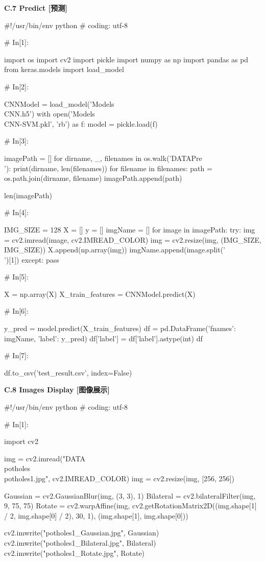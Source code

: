 \documentclass{MathorCupmodeling}
\begin{document}
\textbf{C.7 Predict [预测]}
\begin{python}
#!/usr/bin/env python
# coding: utf-8

# In[1]:


import os
import cv2
import pickle
import numpy as np
import pandas as pd
from keras.models import load_model

# In[2]:


CNNModel = load_model('Models\\CNN.h5')
with open('Models\\CNN-SVM.pkl', 'rb') as f:
    model = pickle.load(f)

# In[3]:


imagePath = []
for dirname, _, filenames in os.walk('DATAPre\\'):
    print(dirname, len(filenames))
    for filename in filenames:
        path = os.path.join(dirname, filename)
        imagePath.append(path)

len(imagePath)

# In[4]:


IMG_SIZE = 128
X = []
y = []
imgName = []
for image in imagePath:
    try:
        img = cv2.imread(image, cv2.IMREAD_COLOR)
        img = cv2.resize(img, (IMG_SIZE, IMG_SIZE))
        X.append(np.array(img))
        imgName.append(image.split('\\')[1])
    except:
        pass

# In[5]:


X = np.array(X)
X_train_features = CNNModel.predict(X)

# In[6]:


y_pred = model.predict(X_train_features)
df = pd.DataFrame({'fnames': imgName, 'label': y_pred})
df['label'] = df['label'].astype(int)
df

# In[7]:


df.to_csv('test_result.csv', index=False)

\end{python}

\textbf{C.8 Images Display [图像展示]}
\begin{python}
#!/usr/bin/env python
# coding: utf-8

# In[1]:


import cv2

img = cv2.imread("DATA\\potholes\\potholes1.jpg", cv2.IMREAD_COLOR)
img = cv2.resize(img, [256, 256])

Gaussian = cv2.GaussianBlur(img, (3, 3), 1)
Bilateral = cv2.bilateralFilter(img, 9, 75, 75)
Rotate = cv2.warpAffine(img, cv2.getRotationMatrix2D((img.shape[1] / 2, img.shape[0] / 2), 30, 1),
                        (img.shape[1], img.shape[0]))

cv2.imwrite("potholes1_Gaussian.jpg", Gaussian)
cv2.imwrite("potholes1_Bilateral.jpg", Bilateral)
cv2.imwrite("potholes1_Rotate.jpg", Rotate)

\end{python}
\end{document}
